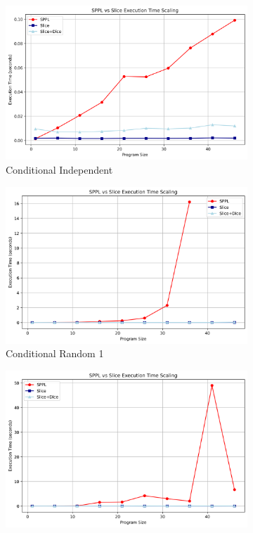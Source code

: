 \begin{figure}[!t]
\centering
\begin{subfigure}{0.32\textwidth}
\includegraphics[width=\textwidth]{../images/scaling/build_conditional_independent_contdice.png}
\caption{Conditional Independent}
\label{fig:cond-benchmarks-a}
\end{subfigure}
\hfill
\begin{subfigure}{0.32\textwidth}
\includegraphics[width=\textwidth]{../images/scaling/build_conditional_random_independent_contdice_1.png}
\caption{Conditional Random 1}
\label{fig:cond-benchmarks-b}
\end{subfigure}
\hfill
\begin{subfigure}{0.32\textwidth}
\includegraphics[width=\textwidth]{../images/scaling/build_conditional_random_independent_contdice_2.png}

\end{subfigure}
\end{figure}
